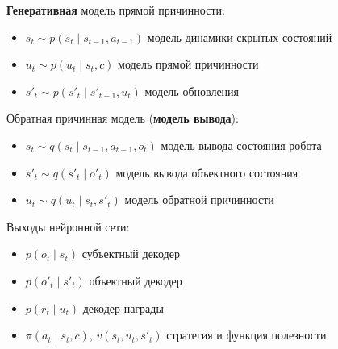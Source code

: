 \begin{frame}
\begin{columns}[b]
\begin{column}{0.48\linewidth}
{    \vspace{0.5cm}
    \footnotesize{\textbf{Генеративная} модель прямой причинности:}
    \scriptsize{
    \begin{itemize}
    \setlength\itemsep{1ex}
    \setlength\topsep{1.5ex}
        \item<3-> $s_t \sim p(s_t \mid s_{t-1}, a_{t-1})$ модель динамики скрытых состояний
        \item<4-> $u_t \sim p(u_t \mid s_t, c)$ модель прямой причинности
        \item<5-> $s'_t \sim p(s'_t\mid s'_{t-1}, u_t)$ модель обновления 
    \end{itemize} }
    \vspace{0.4cm}
    \footnotesize{Обратная причинная модель (\textbf{модель вывода})}:
    \scriptsize{
    \begin{itemize}
    \setlength\itemsep{1ex}
    \setlength\topsep{1.5ex}
        \item<3-> $s_t \sim q(s_t \mid s_{t-1}, a_{t-1}, o_t)$ модель вывода состояния робота 
        \item<8-> $s'_t \sim q(s'_t \mid o'_t)$ модель вывода объектного состояния
        \item<9-> $u_t \sim q(u_t \mid s_t, s'_t)$ модель обратной причинности
    \end{itemize} }
    \vspace{0.4cm}
    \footnotesize{Выходы нейронной сети}:
    \scriptsize{
    \begin{itemize}
    \setlength\itemsep{1ex}
    \setlength\topsep{1.5ex}
        \item<3-> $p(o_t \mid s_t)$ субъектный декодер 
        \item<5-> $p(o'_t \mid s'_t)$ объектный декодер
        \item<6-> $p(r_t \mid u_t)$ декодер награды
        \item<10->$\pi(a_t \mid s_t, c)$, $v(s_{t}, u_{t}, s'_{t})$ стратегия и функция полезности
    \end{itemize} }
    \vspace{0.1cm}
}
\end{column}

\begin{column}{0.48\linewidth}
\end{column}
\end{columns}


\end{frame}

